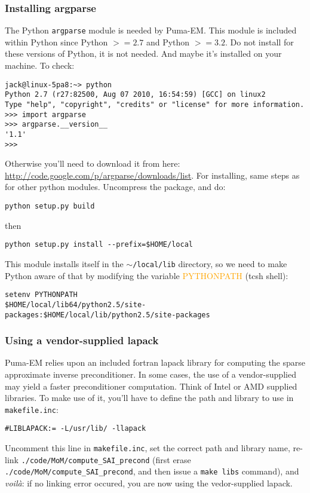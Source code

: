 \documentclass[a4paper,10pt]{book}
\newcommand{\parameter}[1] {\textcolor{orange}{\textsf{#1}}}
\begin{document}
\subsubsection{Installing argparse}
%
\par
The Python \texttt{argparse} module is needed by Puma-EM. This module is included within Python since Python $>= 2.7$ and Python $>= 3.2$. Do not install for these versions of Python, it is not needed. And maybe it's installed on your machine. To check:
\begin{verbatim}
jack@linux-5pa8:~> python
Python 2.7 (r27:82500, Aug 07 2010, 16:54:59) [GCC] on linux2
Type "help", "copyright", "credits" or "license" for more information.
>>> import argparse
>>> argparse.__version__
'1.1'
>>> 
\end{verbatim}
%
\par
Otherwise you'll need to download it from here: \url{http://code.google.com/p/argparse/downloads/list}. For installing, same steps as for other python modules. Uncompress the package, and do:
\begin{verbatim}
python setup.py build
\end{verbatim}
then
\begin{verbatim}
python setup.py install --prefix=$HOME/local
\end{verbatim}
%
\par
This module installs itself in the \texttt{$\sim$/local/lib} directory, so we need to make Python aware of that by modifying the variable \parameter{PYTHONPATH} (tcsh shell):
\begin{verbatim}
setenv PYTHONPATH 
$HOME/local/lib64/python2.5/site-packages:$HOME/local/lib/python2.5/site-packages
\end{verbatim}

\subsubsection{Using a vendor-supplied lapack}
%
\par
Puma-EM relies upon an included fortran lapack library for computing the sparse approximate inverse preconditioner. In some cases, the use of a vendor-supplied may yield a faster preconditioner computation. Think of Intel or AMD supplied libraries. To make use of it, you'll have to define the path and library to use in \texttt{makefile.inc}:
\begin{verbatim}
#LIBLAPACK:= -L/usr/lib/ -llapack
\end{verbatim}
Uncomment this line in \texttt{makefile.inc}, set the correct path and library name, re-link \texttt{./code/MoM/compute\_SAI\_precond} (first erase \texttt{./code/MoM/compute\_SAI\_precond}, and then issue a \texttt{make libs} command), and \textit{voilà}: if no linking error occured, you are now using the vedor-supplied lapack.
\end{document}
